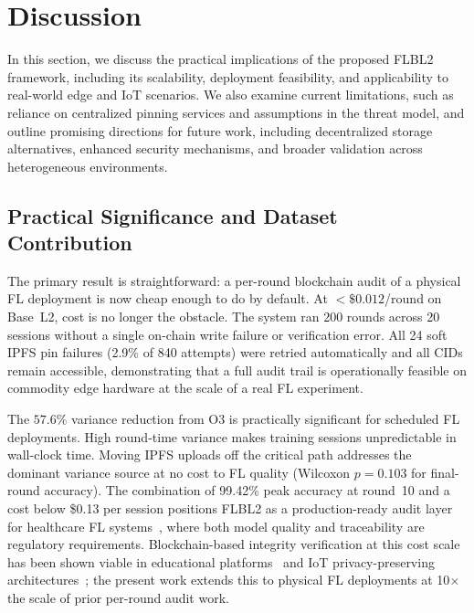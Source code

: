 \documentclass{llncs}
\begin{document}
\FloatBarrier
\section{Discussion}
\label{sec:discussion}
In this section, we discuss the practical implications of the proposed FLBL2 framework, including its scalability, deployment feasibility, and applicability to real-world edge and IoT scenarios. We also examine current limitations, such as reliance on centralized pinning services and assumptions in the threat model, and outline promising directions for future work, including decentralized storage alternatives, enhanced security mechanisms, and broader validation across heterogeneous environments.

\subsection{Practical Significance and Dataset Contribution}
The primary result is straightforward: a per-round blockchain audit of a physical FL deployment is now cheap enough to do by default. At
${<}\$0.012$/round on Base~L2, cost is no longer the obstacle. The
system ran 200 rounds across 20 sessions without a single on-chain
write failure or verification error. All 24 soft IPFS pin failures (2.9\% of 840
attempts) were retried automatically and all CIDs remain accessible, demonstrating
that a full audit trail is operationally feasible on commodity edge
hardware at the scale of a real FL experiment.

The $57.6\%$ variance reduction from O3 is practically significant for
scheduled FL deployments. High round-time variance makes training sessions
unpredictable in wall-clock time. Moving IPFS uploads off the critical path
addresses the dominant variance source at no cost to FL quality
(Wilcoxon $p=0.103$ for final-round accuracy). The combination of
99.42\% peak accuracy at round~10 and a cost below \$0.13 per session
positions FLBL2 as a production-ready audit layer for healthcare FL
systems~\cite{yazici2023ehealth,singh2022framework,bayan2024blockchain},
where both model quality and traceability are regulatory requirements.
Blockchain-based integrity verification at this cost scale has been shown
viable in educational platforms~\cite{bayan2024blockchain} and IoT
privacy-preserving architectures~\cite{bayan2025permissionless,bayan2025privacy};
the present work extends this to physical FL deployments at 10$\times$ the
scale of prior per-round audit work.
\end{document}
